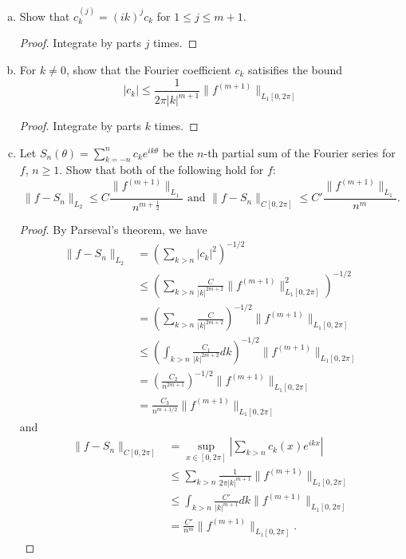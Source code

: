 \documentclass{article}
\begin{document}
\newcommand{\ckj}{c_k^{(j)}}

\begin{enumerate}[(a)]
\item Show that $\ckj = (ik)^j c_k$ for $1 \le j \le m+1$.

\begin{proof}
Integrate by parts $j$ times.
\end{proof}

\item For $k \neq 0$, show that the Fourier coefficient $c_k$ satisifies the bound
$$ | c_k | \le \frac 1 {2 \pi |k|^{m+1}} \|f^{(m+1)}\|_{L_1[0,2\pi]}$$

\begin{proof}
Integrate by parts $k$ times.
\end{proof}

\item Let $S_n(\theta) = \sum_{k=-n}^n c_k e^{ik\theta}$ be the $n$-th partial sum of the Fourier series for $f$, $n \ge 1$. Show that both of the following hold for $f$:
$$\|f - S_n \|_{L_2} \le C \frac{\|f^{(m+1)}\|_{L_1}} {n^{m + \frac 1 2}} \text{ and }  \|f - S_n\|_{C[0,2\pi]} \le C' \frac{\|f^{(m+1)}\|_{L_1}}{n^m}.$$
\begin{proof}
By Parseval's theorem, we have 
\begin{align*}
\|f - S_n \|_{L_2} & = \left(\sum_{k > n} |c_k|^2\right)^{-1/2}
\\ & \le \left(\sum_{k > n} \frac C {|k|^{2m+2}} \|f^{(m+1)}\|_{L_1[0,2\pi]}^2 \right)^{-1/2}
\\ & = \left(\sum_{k > n} \frac C {|k|^{2m+2}} \right)^{-1/2} \|f^{(m+1)}\|_{L_1[0,2\pi]}
\\ & \le \left( \int_{k > n} \frac {C_1} {|k|^{2m+2}} dk \right)^{-1/2} \|f^{(m+1)}\|_{L_1[0,2\pi]}
\\ & = \left(  \frac {C_2} {n^{2m+1}} \right)^{-1/2} \|f^{(m+1)}\|_{L_1[0,2\pi]}
\\ & = \frac {C_3} {n^{m+1/2}} \|f^{(m+1)}\|_{L_1[0,2\pi]}
\end{align*}
and
\begin{align*}
\|f - S_n \|_{C[0, 2\pi]} & = \sup_{x \in [0,2\pi]} \left| \sum_{k > n} c_k(x) e^{ikx} \right|
\\ & \le \sum_{k > n} \frac 1 {2 \pi |k|^{m+1}} \|f^{(m+1)}\|_{L_1[0,2\pi]}
\\ & \le \int_{k > n} \frac {C'} {|k|^{m+1}} dk \|f^{(m+1)}\|_{L_1[0,2\pi]}
\\ & = \frac {C'} {n^{m}} \|f^{(m+1)}\|_{L_1[0,2\pi]}.
\end{align*}
\end{proof}



\end{enumerate}
\end{document}
